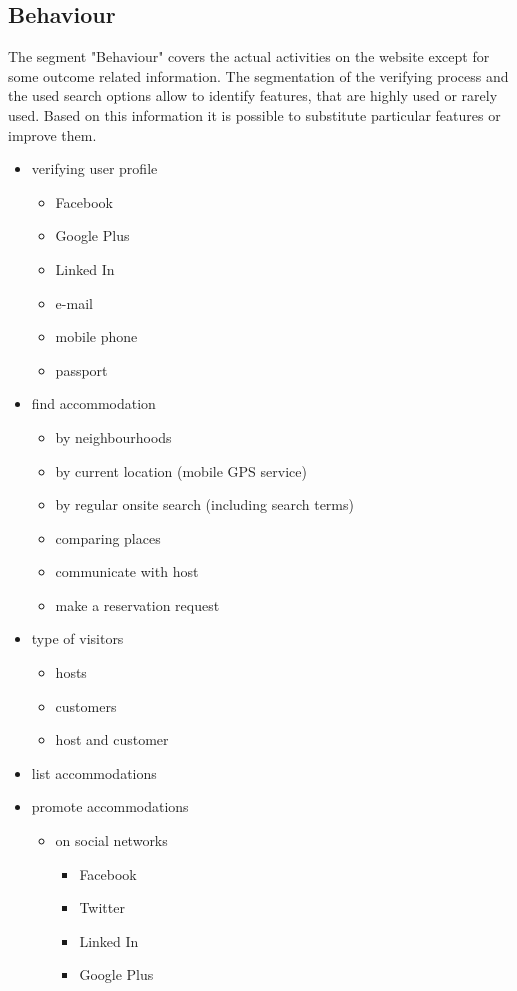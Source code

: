\subsection{Behaviour}
The segment "Behaviour" covers the actual activities on the website except for some outcome related information. The segmentation of the verifying process and the used search options allow to identify features, that are highly used or rarely used. Based on this information it is possible to substitute particular features or improve them.

\begin{itemize}
\item verifying user profile
\begin{itemize}
\item Facebook
\item Google Plus
\item Linked In
\item e-mail
\item mobile phone
\item passport
\end{itemize}
\item find accommodation
\begin{itemize}
\item by neighbourhoods
\item by current location (mobile GPS service)
\item by regular onsite search (including search terms)
\item comparing places
\item communicate with host
\item make a reservation request
\end{itemize}
\item type of visitors
\begin{itemize}
\item hosts
\item customers
\item host and customer
\end{itemize}
\item list accommodations
\item promote accommodations
\begin{itemize}
\item on social networks
\begin{itemize}
\item Facebook
\item Twitter
\item Linked In
\item Google Plus

\end{itemize}
\end{itemize}
\end{itemize}
